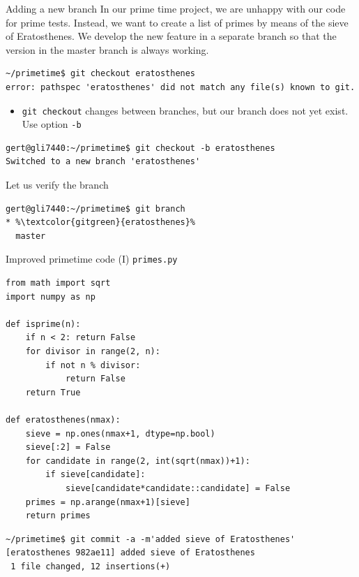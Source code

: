 \documentclass[svgnames]{beamer}
\begin{document}
\begin{frame}[fragile]{Adding a new branch}
 In our prime time project, we are unhappy with our code for prime tests.
 Instead, we want to create a list of primes by means of the sieve of
 Eratosthenes. We develop the new feature in a separate branch so that the
 version in the master branch is always working.

 \begin{lstlisting}[breaklines=true]
~/primetime$ git checkout eratosthenes
error: pathspec 'eratosthenes' did not match any file(s) known to git.
 \end{lstlisting}
 \begin{itemize}
  \item \texttt{git checkout} changes between branches, but our branch
        does not yet exist. Use option \texttt{-b}
 \end{itemize}
 \begin{lstlisting}
gert@gli7440:~/primetime$ git checkout -b eratosthenes
Switched to a new branch 'eratosthenes'
 \end{lstlisting}

 \vspace{0.2truecm}
 Let us verify the branch
 \begin{lstlisting}[escapechar=\%]
gert@gli7440:~/primetime$ git branch
* %\textcolor{gitgreen}{eratosthenes}%
  master
 \end{lstlisting}
\end{frame}

\begin{frame}[fragile]{Improved primetime code (I)}
 \texttt{primes.py}
 \begin{lstlisting}
from math import sqrt
import numpy as np

def isprime(n):
    if n < 2: return False
    for divisor in range(2, n):
        if not n % divisor:
            return False
    return True

def eratosthenes(nmax):
    sieve = np.ones(nmax+1, dtype=np.bool)
    sieve[:2] = False
    for candidate in range(2, int(sqrt(nmax))+1):
        if sieve[candidate]:
            sieve[candidate*candidate::candidate] = False
    primes = np.arange(nmax+1)[sieve]
    return primes
 \end{lstlisting}
 \begin{lstlisting}
~/primetime$ git commit -a -m'added sieve of Eratosthenes'
[eratosthenes 982ae11] added sieve of Eratosthenes
 1 file changed, 12 insertions(+)
 \end{lstlisting}
\end{frame}
\end{document}

